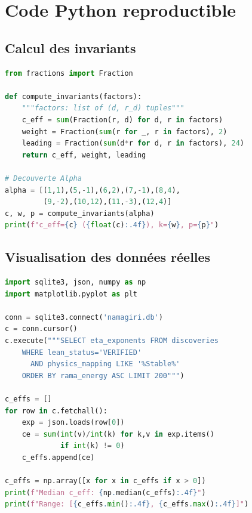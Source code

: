 \section{Code Python reproductible}
\label{app:python}

\subsection{Calcul des invariants}

\begin{lstlisting}[language=Python, caption={Calcul exact des invariants d'un eta-quotient.}]
from fractions import Fraction

def compute_invariants(factors):
    """factors: list of (d, r_d) tuples"""
    c_eff = sum(Fraction(r, d) for d, r in factors)
    weight = Fraction(sum(r for _, r in factors), 2)
    leading = Fraction(sum(d*r for d, r in factors), 24)
    return c_eff, weight, leading

# Decouverte Alpha
alpha = [(1,1),(5,-1),(6,2),(7,-1),(8,4),
         (9,-2),(10,12),(11,-3),(12,4)]
c, w, p = compute_invariants(alpha)
print(f"c_eff={c} ({float(c):.4f}), k={w}, p={p}")
\end{lstlisting}

\subsection{Visualisation des données réelles}

\begin{lstlisting}[language=Python, caption={Entropie de Cardy à partir des données réelles.}]
import sqlite3, json, numpy as np
import matplotlib.pyplot as plt

conn = sqlite3.connect('namagiri.db')
c = conn.cursor()
c.execute("""SELECT eta_exponents FROM discoveries
    WHERE lean_status='VERIFIED'
      AND physics_mapping LIKE '%Stable%'
    ORDER BY rama_energy ASC LIMIT 200""")

c_effs = []
for row in c.fetchall():
    exp = json.loads(row[0])
    ce = sum(int(v)/int(k) for k,v in exp.items()
             if int(k) != 0)
    c_effs.append(ce)

c_effs = np.array([x for x in c_effs if x > 0])
print(f"Median c_eff: {np.median(c_effs):.4f}")
print(f"Range: [{c_effs.min():.4f}, {c_effs.max():.4f}]")
\end{lstlisting}
